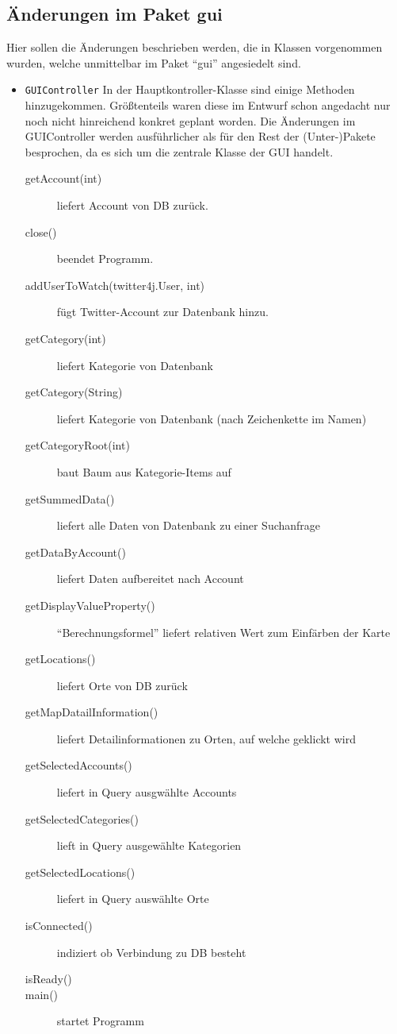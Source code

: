 \subsection{Änderungen im Paket gui}
Hier sollen die Änderungen beschrieben werden, die in Klassen vorgenommen wurden, welche unmittelbar im Paket "`gui"' angesiedelt sind.
\begin{itemize}
	\item \lstinline{GUIController}
	\quad 
	In der Hauptkontroller-Klasse sind einige Methoden hinzugekommen. Größtenteils waren diese im Entwurf schon angedacht nur noch nicht hinreichend konkret geplant worden. Die Änderungen im GUIController werden ausführlicher als für den Rest der (Unter-)Pakete besprochen, da es sich um die zentrale Klasse der GUI handelt.
	\begin{description}
		\item[getAccount(int)] liefert Account von DB zurück.
		\item[close()] beendet Programm.
		\item[addUserToWatch(twitter4j.User, int)] fügt Twitter-Account zur Datenbank hinzu.
		\item[getCategory(int)] liefert Kategorie von Datenbank
		\item[getCategory(String)] liefert Kategorie von Datenbank (nach Zeichenkette im Namen)
		\item[getCategoryRoot(int\text{[]})] baut Baum aus Kategorie-Items auf
		\item[getSummedData()] liefert alle Daten von Datenbank zu einer Suchanfrage
		\item[getDataByAccount()] liefert Daten aufbereitet nach Account
		\item[getDisplayValueProperty()] "`Berechnungsformel"' liefert relativen Wert zum Einfärben der Karte
		\item[getLocations()] liefert Orte von DB zurück
		\item[getMapDatailInformation()] liefert Detailinformationen zu Orten, auf welche geklickt wird
		\item[getSelectedAccounts()] liefert in Query ausgwählte Accounts
		\item[getSelectedCategories()] lieft in Query ausgewählte Kategorien
		\item[getSelectedLocations()] liefert in Query auswählte Orte
		\item[isConnected()] indiziert ob Verbindung zu DB besteht
		\item[isReady()]
		\item[main()] startet Programm

\end{description}
\end{itemize}
